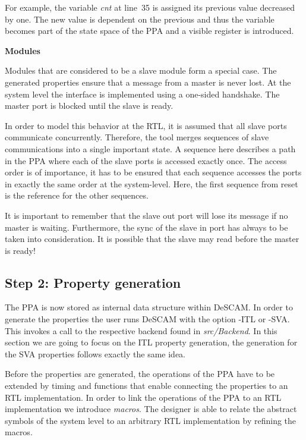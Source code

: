 For example, the variable \textit{cnt} at line~35 is assigned its previous value decreased by one. 
The new value is dependent on the previous and thus the variable becomes part of the state space of the PPA and a visible register is introduced. 


\textbf{Modules}

Modules that are considered to be a slave module form a special case.
The generated properties ensure that a message from a master is never lost. 
At the system level the interface is implemented using a one-sided handshake.
The master port is blocked until the slave is ready.

In order to model this behavior at the RTL, it is assumed that all slave ports communicate concurrently. 
Therefore, the tool merges sequences of slave communications into a single important state. 
A sequence here describes a path in the PPA where each of the slave ports is accessed exactly once. 
The access order is of importance, it has to be ensured that each sequence accesses the ports in exactly the same order at the system-level. 
Here, the first sequence from reset is the reference for the other sequences.

It is important to remember that the slave out port will lose its message if no master is waiting. 
Furthermore, the sync of the slave in port has always to be taken into consideration. 
It is possible that the slave may read before the master is ready! 

\subsection{Step 2: Property generation}

The PPA is now stored as internal data structure within DeSCAM. 
In order to generate the properties the user runs DeSCAM with the option -ITL or -SVA.
This invokes a call to the respective backend found in \textit{src/Backend}. 
In this section we are going to focus on the ITL property generation, the generation for the SVA properties follows exactly the same idea. 

Before the properties are generated, the operations of the PPA have to be extended by timing and functions that enable connecting the properties to an RTL implementation. 
In order to link the operations of the PPA to an RTL implementation we introduce \textit{macros}.
The designer is able to relate the abstract symbols of the system level to an arbitrary RTL implementation by refining the macros. 

